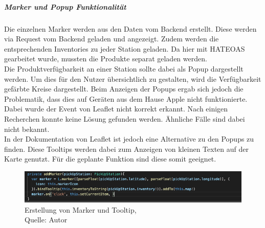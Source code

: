 \subparagraph{Marker und Popup Funktionalität}
Die einzelnen Marker werden aus den Daten vom Backend erstellt. Diese werden via Request vom Backend geladen und angezeigt. Zudem werden die entsprechenden Inventories zu jeder Station geladen. Da hier mit HATEOAS gearbeitet wurde, mussten die Produkte separat geladen werden. \\
Die Produktverfügbarkeit an einer Station sollte dabei als Popup dargestellt werden. Um dies für den Nutzer übersichtlich zu gestalten, wird die Verfügbarkeit gefärbte Kreise dargestellt. 
Beim Anzeigen der Popups ergab sich jedoch die Problematik, dass dies auf Geräten aus dem Hause Apple nicht funktionierte. Dabei wurde der Event von Leaflet nicht korrekt erkannt. Nach einigen Recherchen konnte keine Lösung gefunden werden. Ähnliche Fälle sind dabei nicht bekannt. \\
In der Dokumentation von Leaflet ist jedoch eine Alternative zu den Popups zu finden. Diese Tooltips werden dabei zum Anzeigen von kleinen Texten auf der Karte genutzt. Für die geplante Funktion sind diese somit geeignet. 
\begin{figure}[H]
	\centering
	\includegraphics[width=1\textwidth]{images/tooltipImp.PNG}
	\caption[Erstellung von Marker und Tooltip]{Erstellung von Marker und Tooltip,\\ Quelle: Autor}
	\label{img: tooltip}
\end{figure} 

